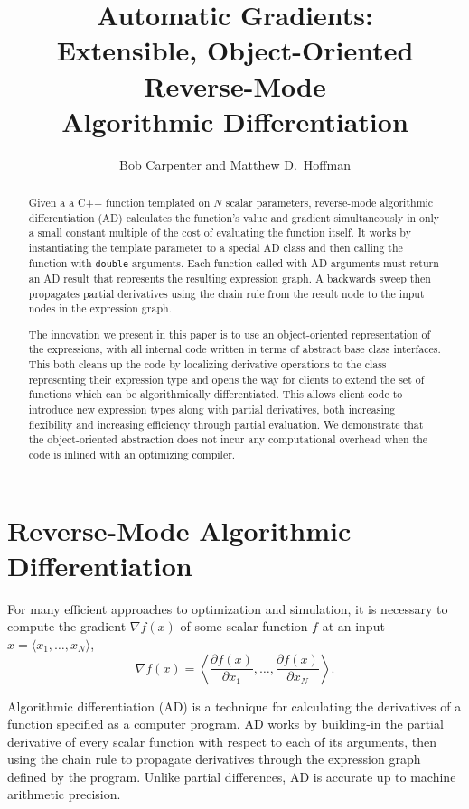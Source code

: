 \documentclass[11pt]{article}
\title{Automatic Gradients:
\\
Extensible, Object-Oriented Reverse-Mode 
\\
Algorithmic Differentiation}
\author{Bob Carpenter and Matthew D.\ Hoffman}
\begin{document}
\maketitle
\begin{abstract}
  Given a a C++ function templated on $N$ scalar parameters,
  reverse-mode algorithmic differentiation (AD) calculates the
  function's value and gradient simultaneously in only a small
  constant multiple of the cost of evaluating the function itself.  It
  works by instantiating the template parameter to a special AD class
  and then calling the function with {\tt double} arguments.  Each
  function called with AD arguments must return an AD result that
  represents the resulting expression graph.  A backwards sweep then
  propagates partial derivatives using the chain rule from the result
  node to the input nodes in the expression graph.

  The innovation we present in this paper is to use an object-oriented
  representation of the expressions, with all internal code written in
  terms of abstract base class interfaces.  This both cleans up the
  code by localizing derivative operations to the class representing
  their expression type and opens the way for clients to extend the
  set of functions which can be algorithmically differentiated.  This
  allows client code to introduce new expression types along with
  partial derivatives, both increasing flexibility and increasing
  efficiency through partial evaluation.  We demonstrate that the
  object-oriented abstraction does not incur any computational
  overhead when the code is inlined with an optimizing compiler.
\end{abstract}

\section{Reverse-Mode Algorithmic Differentiation}

For many efficient approaches to optimization and simulation, it is
necessary to compute the gradient $\nabla f(x)$ of some scalar
function $f$ at an input $x = \langle x_1,\ldots,x_N \rangle$,
%
\[
\nabla f(x) 
= \left\langle 
\frac{\partial f(x)}{\partial x_1},
\ldots,
\frac{\partial f(x)}{\partial x_N}
\right\rangle.
\]

Algorithmic differentiation (AD) is a technique for calculating the
derivatives of a function specified as a computer program.  AD works
by building-in the partial derivative of every scalar function with
respect to each of its arguments, then using the chain rule to
propagate derivatives through the expression graph defined by the
program.  Unlike partial differences, AD is accurate up to machine
arithmetic precision.
\end{document}
